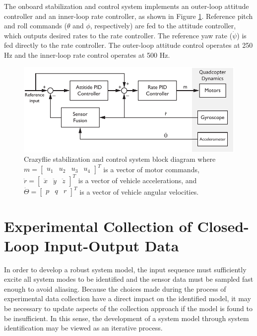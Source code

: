 The onboard stabilization and control system implements an outer-loop attitude controller and an inner-loop rate controller, as shown in Figure \ref{fig:control_system_block_diagram}. Reference pitch and roll commands ($\theta$ and $\phi$, respectively) are fed to the attitude controller, which outputs desired rates to the rate controller. The reference yaw rate ($\dot\psi$) is fed directly to the rate controller. The outer-loop attitude control operates at 250 Hz and the inner-loop rate control operates at 500 Hz.
\begin{figure}[htb!]
	\centering
	\includegraphics{../fig/crazyflie_control_system_block_diagram.pdf}
	\caption[Crazyflie stabilization and control system block diagram.]{Crazyflie stabilization and control system block diagram where $m = \begin{bmatrix}u_1 & u_2 & u_3 & u_4\end{bmatrix}^T$ is a vector of motor commands, $\ddot r = \begin{bmatrix}\ddot{x}&\ddot{y}&\ddot{z}\end{bmatrix}^T$ is a vector of vehicle accelerations, and $\dot\Theta = \begin{bmatrix}p & q & r\end{bmatrix}^T$ is a vector of vehicle angular velocities.}
	\label{fig:control_system_block_diagram}
\end{figure}


\section{Experimental Collection of Closed-Loop Input-Output Data}
In order to develop a robust system model, the input sequence must sufficiently excite all system modes to be identified and the sensor data must be sampled fast enough to avoid aliasing. Because the choices made during the process of experimental data collection have a direct impact on the identified model, it may be necessary to update aspects of the collection approach if the model is found to be insufficient. In this sense, the development of a system model through system identification may be viewed as an iterative process.

